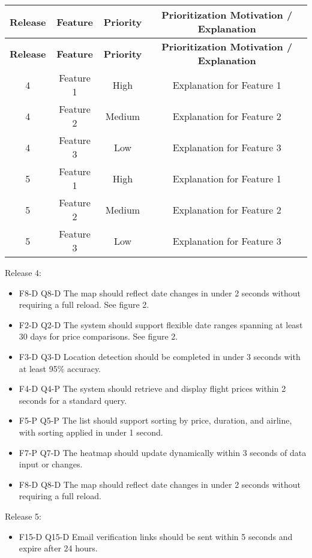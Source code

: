 
\begin{longtable}{|c|c|c|c|}
    \hline
\rowcolor{headergray}
\textbf{Release} & \textbf{Feature} & \textbf{Priority} & \textbf{Prioritization Motivation / Explanation} \\
\hline
\endfirsthead
\rowcolor{headergray}
\hline
\textbf{Release} & \textbf{Feature} & \textbf{Priority} & \textbf{Prioritization Motivation / Explanation} \\
\hline
\endhead
\hline
\endfoot
\hline
\endlastfoot

4 & Feature 1 & High & Explanation for Feature 1 \\
4 & Feature 2 & Medium & Explanation for Feature 2 \\
4 & Feature 3 & Low & Explanation for Feature 3 \\
\hline
5 & Feature 1 & High & Explanation for Feature 1 \\
5 & Feature 2 & Medium & Explanation for Feature 2 \\
5 & Feature 3 & Low & Explanation for Feature 3 \\
\hline

\end{longtable}

Release 4:
\begin{itemize}
    \item F8-D  Q8-D  The map should reflect date changes in under 2 seconds without requiring a full reload. See figure 2.
    \item F2-D  Q2-D  The system should support flexible date ranges spanning at least 30 days for price comparisons. See figure 2.
    \item F3-D  Q3-D  Location detection should be completed in under 3 seconds with at least 95\% accuracy.
    \item F4-D  Q4-P  The system should retrieve and display flight prices within 2 seconds for a standard query.
    \item F5-P  Q5-P  The list should support sorting by price, duration, and airline, with sorting applied in under 1 second.
    \item F7-P  Q7-D  The heatmap should update dynamically within 3 seconds of data input or changes.
    \item F8-D  Q8-D  The map should reflect date changes in under 2 seconds without requiring a full reload.
\end{itemize}

Release 5:
\begin{itemize}
    \item F15-D  Q15-D  Email verification links should be sent within 5 seconds and expire after 24 hours.
\end{itemize}
